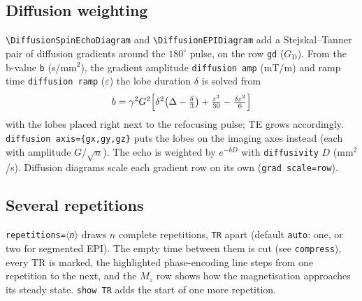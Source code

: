 \documentclass[11pt]{article}
\newcommand\cs[1]{\texttt{\textbackslash#1}}
\newcommand\key[1]{\texttt{#1}}
\newcommand\meta[1]{\ensuremath{\langle}\textit{#1}\ensuremath{\rangle}}
\begin{document}
\subsection{Diffusion weighting}
\cs{DiffusionSpinEchoDiagram} and \cs{DiffusionEPIDiagram} add a
Stejskal--Tanner pair of diffusion gradients around the $180^\circ$ pulse, on
the row \texttt{gd} ($G_\mathrm{D}$). From the b-value \key{b} (s/mm$^2$), the
gradient amplitude \key{diffusion amp} (mT/m) and ramp time \key{diffusion ramp}
($\varepsilon$) the lobe duration $\delta$ is solved from
\[
  b = \gamma^2 G^2\Bigl[\delta^2\bigl(\Delta-\tfrac{\delta}{3}\bigr)
      + \tfrac{\varepsilon^3}{30} - \tfrac{\delta\varepsilon^2}{6}\Bigr]
\]
with the lobes placed right next to the refocusing pulse; TE grows accordingly.
\key{diffusion axis=\{gx,gy,gz\}} puts the lobes on the imaging axes instead
(each with amplitude $G/\sqrt{n}$). The echo is weighted by
$e^{-b D}$ with \key{diffusivity} $D$ (mm$^2$/s). Diffusion diagrams scale each
gradient row on its own (\key{grad scale=row}).
\begin{example}
\DiffusionSpinEchoDiagram[values, rows={rf,gz,gx,gd,sig}]
\end{example}
\begin{example}
\DiffusionEPIDiagram[b=500]
\end{example}

\subsection{Several repetitions}
\key{repetitions=\meta{n}} draws $n$ complete repetitions, \key{TR} apart (default
\texttt{auto}: one, or two for segmented EPI). The
empty time between them is cut (see \key{compress}), every TR is marked, the
highlighted phase-encoding line steps from one repetition to the next, and the
$M_z$ row shows how the magnetisation approaches its steady state.
\key{show TR} adds the start of one more repetition.
\begin{example}
\SpinEchoDiagram[repetitions=3, TR=600, rows={rf,gz,gy,gx,sig,mz}]
\end{example}
\begin{example}
\GradientEchoDiagram[repetitions=3, TR=12, spoiler, ticks,
                     rows={rf,gz,gy,gx,mz}]
\end{example}
\begin{example}
\EPIDiagram[repetitions=2, ticks, break style=zigzag,
            rows={rf,gz,gy,gx,adc}]
\end{example}
\end{document}
